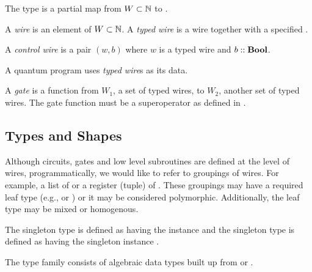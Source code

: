 \begin{definition}\label{def:arity}
  The type  is a partial map from $W\subset\mathbb{N}$ to .
\end{definition}

\begin{definition}\label{def:wire}
  A \emph{wire} is an element of $W\subset\mathbb{N}$. A \emph{typed wire} is a wire
  together with a specified .
\end{definition}

\begin{definition}\label{def:control}
  A \emph{control wire} is a pair $(w,b)$ where $w$ is a
  typed wire and $b::\mathbf{{Bool}}$.
\end{definition}

A quantum program uses \emph{typed wire}s as its data.

\begin{definition}\label{def:gate}
  A \emph{gate} is a function from $W_1$, a set of typed wires, to $W_2$,
  another
  set of typed wires. The gate function must be a superoperator
  as defined in \cite{selinger04:qpl}.
\end{definition}

\subsection{Types and Shapes} %
\label{sub:types_and_shapes}
Although circuits, gates and low level subroutines are defined at
the level of wires, programmatically, we would like
to refer to groupings of wires. For example, a list of \qubit
or a register (tuple) of \qubit. These groupings may have a
required leaf type (e.g., \qubit or \bit) or it may be
considered polymorphic. Additionally, the leaf type may be mixed
or homogenous.


\begin{definition}\label{def:singletons}
  The singleton type  is defined as having the instance \Bs and the
  singleton type  is defined as having the singleton instance \Qs.
\end{definition}

\begin{definition}\label{def:qcdata}
  The type family  consists of algebraic data types
  built up from \bit or \qubit.
\end{definition}

